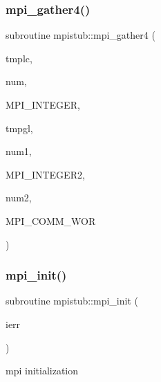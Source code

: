\mbox{\label{namespacempistub_a6c7b2f5337f97885b72a76ec35729075}} 
\subsubsection{\texorpdfstring{mpi\_gather4()}{mpi\_gather4()}}
{\footnotesize\ttfamily subroutine mpistub\+::mpi\+\_\+gather4 (\begin{DoxyParamCaption}\item[{integer}]{tmplc,  }\item[{}]{num,  }\item[{}]{M\+P\+I\+\_\+\+I\+N\+T\+E\+G\+ER,  }\item[{integer, dimension(\+:)}]{tmpgl,  }\item[{}]{num1,  }\item[{}]{M\+P\+I\+\_\+\+I\+N\+T\+E\+G\+E\+R2,  }\item[{}]{num2,  }\item[{}]{M\+P\+I\+\_\+\+C\+O\+M\+M\+\_\+\+W\+OR }\end{DoxyParamCaption})}

\mbox{\label{namespacempistub_af6819ee02570b8c8bef94e79e67a4af9}} 
\subsubsection{\texorpdfstring{mpi\_init()}{mpi\_init()}}
{\footnotesize\ttfamily subroutine mpistub\+::mpi\+\_\+init (\begin{DoxyParamCaption}\item[{}]{ierr }\end{DoxyParamCaption})}



mpi initialization 

\mbox{\label{namespacempistub_ada728226719e1870c85e45f6594cccbd}} 
